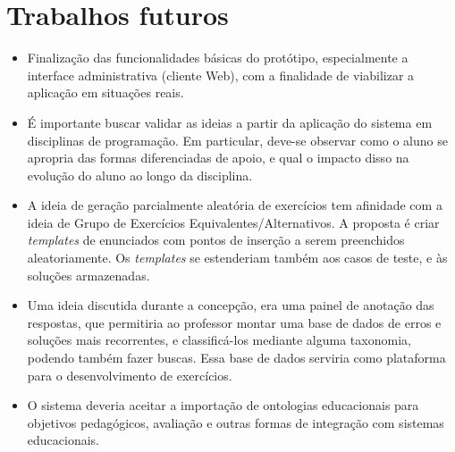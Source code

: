 \section{Trabalhos futuros}
\begin{itemize}
    \item Finalização das funcionalidades básicas do protótipo, especialmente a interface administrativa (cliente Web), com a finalidade de viabilizar a aplicação em situações reais.   
    \item É importante buscar validar as ideias a partir da aplicação do sistema em disciplinas de programação.
    Em particular, deve-se observar como o aluno se apropria das formas diferenciadas de apoio, e qual o impacto disso na evolução do aluno ao longo da disciplina.
    \item A ideia de geração parcialmente aleatória de exercícios tem afinidade com a ideia de Grupo de Exercícios Equivalentes/Alternativos. A proposta é criar \emph{templates} de enunciados com pontos de inserção a serem preenchidos aleatoriamente. Os \emph{templates} se estenderiam também aos casos de teste, e às soluções armazenadas.
    \item Uma ideia discutida durante a concepção, era uma painel de anotação das respostas, que permitiria
    ao professor montar uma base de dados de erros e soluções mais recorrentes, e classificá-los mediante alguma taxonomia, podendo também fazer buscas. Essa base de dados serviria como plataforma para o desenvolvimento de exercícios. 
    \item O sistema deveria aceitar a importação de ontologias educacionais para objetivos pedagógicos, avaliação e outras formas de integração com sistemas educacionais.
\end{itemize}

